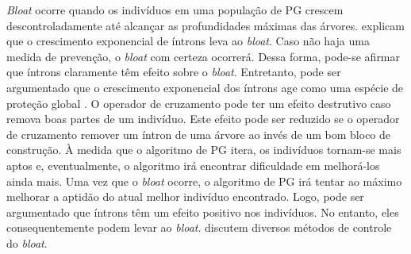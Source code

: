 \begin{figure}[H]
    \centering
    \caption{Exemplos de íntrons:  representa a expressão lógica $1 \wedge 1$ e  representa a expressão lógica $0 \vee 0$.}
    \label{fig:introns}
    \begin{subfigure}[b]{0.5\linewidth}
        \centering
        \caption{}
        \label{fig:introns-and}
    \end{subfigure}%
    \begin{subfigure}[b]{0.5\linewidth}
        \centering
        \caption{}
        \label{fig:introns-or}
    \end{subfigure}
    \begin{center}
    \end{center}
\end{figure}

\textit{Bloat} ocorre quando os indivíduos em uma população de PG crescem descontroladamente até alcançar as profundidades máximas das árvores.  explicam que o crescimento exponencial de íntrons leva ao \textit{bloat}. Caso não haja uma medida de prevenção, o \textit{bloat} com certeza ocorrerá. Dessa forma, pode-se afirmar que íntrons claramente têm efeito sobre o \textit{bloat}. Entretanto, pode ser argumentado que o crescimento exponencial dos íntrons age como uma espécie de proteção global \cite{banzhaf1998}. O operador de cruzamento pode ter um efeito destrutivo caso remova boas partes de um indivíduo. Este efeito pode ser reduzido se o operador de cruzamento remover um íntron de uma árvore ao invés de um bom bloco de construção. À medida que o algoritmo de PG itera, os indivíduos tornam-se mais aptos e, eventualmente, o algoritmo irá encontrar dificuldade em melhorá-los ainda mais. Uma vez que o \textit{bloat} ocorre, o algoritmo de PG irá tentar ao máximo melhorar a aptidão do atual melhor indivíduo encontrado. Logo, pode ser argumentado que íntrons têm um efeito positivo nos indivíduos. No entanto, eles consequentemente podem levar ao \textit{bloat}.  discutem diversos métodos de controle do \textit{bloat}.
